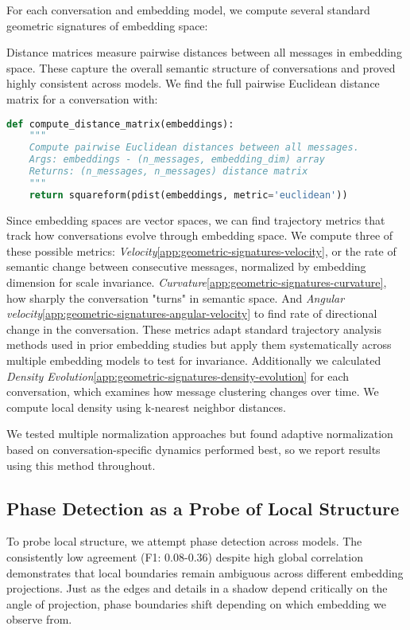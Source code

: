 \documentclass[11pt,letterpaper]{article}
\begin{document}
For each conversation and embedding model, we compute several standard geometric signatures of embedding space:

Distance matrices measure pairwise distances between all messages in embedding space. These capture the overall semantic structure of conversations and proved highly consistent across models. We find the full pairwise Euclidean distance matrix for a conversation with:

\begin{lstlisting}[language=Python, basicstyle=\small]
def compute_distance_matrix(embeddings):
    """
    Compute pairwise Euclidean distances between all messages.
    Args: embeddings - (n_messages, embedding_dim) array
    Returns: (n_messages, n_messages) distance matrix
    """
    return squareform(pdist(embeddings, metric='euclidean'))
\end{lstlisting}

Since embedding spaces are vector spaces, we can find trajectory metrics that track how conversations evolve through embedding space. We compute three of these possible metrics: \textit{Velocity}\ref{app:geometric-signatures-velocity}, or the rate of semantic change between consecutive messages, normalized by embedding dimension for scale invariance. \textit{Curvature}\ref{app:geometric-signatures-curvature}, how sharply the conversation "turns" in semantic space. And \textit{Angular velocity}\ref{app:geometric-signatures-angular-velocity} to find rate of directional change in the conversation. These metrics adapt standard trajectory analysis methods used in prior embedding studies \citep{brinberg2024dynamic, palominos2024trajectories} but apply them systematically across multiple embedding models to test for invariance.
Additionally we calculated \textit{Density Evolution}\ref{app:geometric-signatures-density-evolution} for each conversation, which examines how message clustering changes over time. We compute local density using k-nearest neighbor distances.

We tested multiple normalization approaches but found adaptive normalization based on conversation-specific dynamics performed best, so we report results using this method throughout.

\subsection{Phase Detection as a Probe of Local Structure}

To probe local structure, we attempt phase detection across models. The consistently low agreement (F1: 0.08-0.36) despite high global correlation demonstrates that local boundaries remain ambiguous across different embedding projections. Just as the edges and details in a shadow depend critically on the angle of projection, phase boundaries shift depending on which embedding we observe from.
\end{document}
